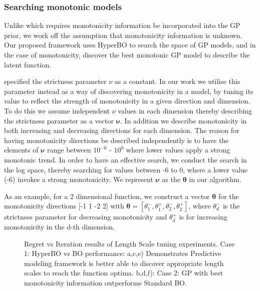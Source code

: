 \documentclass{article}
\begin{document}
\subsubsection{Searching monotonic models}

Unlike \cite{riihimaki2010gaussian} which requires monotonicity information be incorporated into the GP prior, we work off the assumption that monotonicity information is unknown. Our proposed framework uses HyperBO to search the space of GP models, and in the case of monotonicity, discover the best monotonic GP model to describe the latent function. 

\cite{riihimaki2010gaussian} specified the strictness parameter $\nu$ as a constant. In our work we utilise this parameter instead as a way of discovering monotonicity in a model, by tuning its value to reflect the strength of monotonicity in a given direction and dimension.
To do this we assume independent $\nu$ values in each dimension thereby describing the strictness parameter as a vector $\boldsymbol{\nu}$. In addition we describe monotonicity in both increasing and decreasing directions for each dimension. The reason for having monotonicity directions be described independently is to have the elements of $\boldsymbol{\nu}$ range between $10^{-6}$ - $10^{0}$ where lower values apply a strong monotonic trend. In order to have an effective search, we conduct the search in the log space, thereby searching for values between -6 to 0, where a lower value (-6) invokes a strong monotonicity. We represent  $\boldsymbol{\nu}$ as the $\boldsymbol{\theta}$ in our algorithm. 

As an example, for a 2 dimensional function, we construct a vector $\boldsymbol{\theta}$ for the monotonicity directions [-1 1 -2 2] with $\boldsymbol{\theta} = [\theta_{1}^{-}, \theta_{1}^{+}, \theta_{2}^{-}, \theta_{2}^{+}]$, where $\theta_{d}^{-}$ is the strictness parameter for decreasing monotonicity and $\theta_{d}^{+}$ is for increasing monotonicity in the d-th dimension. 

\begin{figure}[t]
	\centering
	\qquad
	\qquad
	\qquad
	\qquad
	\qquad
	\caption{Regret vs Iteration results of Length Scale tuning experiments. Case 1: HyperBO vs BO performance: a,c,e) Demonstrates Predictive modeling framework is better able to discover appropriate length scales to reach the function optima.  b,d,f): Case 2: GP with best monotonicity information outperforms Standard BO.}%
	\label{fig:LengthScale_experiments}%
\end{figure}
\end{document}
